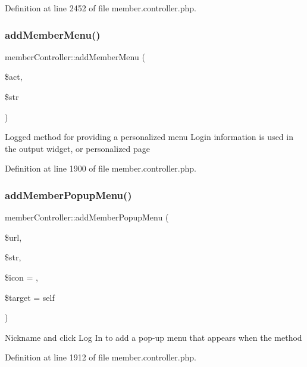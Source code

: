 Definition at line 2452 of file member.\+controller.\+php.

\mbox{\label{classmemberController_aaa52725f8ba9ba16cfe4b350a51d7420}} 
\subsubsection{\texorpdfstring{add\+Member\+Menu()}{addMemberMenu()}}
{\footnotesize\ttfamily member\+Controller\+::add\+Member\+Menu (\begin{DoxyParamCaption}\item[{}]{\$act,  }\item[{}]{\$str }\end{DoxyParamCaption})}

Logged method for providing a personalized menu Login information is used in the output widget, or personalized page 

Definition at line 1900 of file member.\+controller.\+php.

\mbox{\label{classmemberController_a9672e0e43f813d6e791ab62543fc78b0}} 
\subsubsection{\texorpdfstring{add\+Member\+Popup\+Menu()}{addMemberPopupMenu()}}
{\footnotesize\ttfamily member\+Controller\+::add\+Member\+Popup\+Menu (\begin{DoxyParamCaption}\item[{}]{\$url,  }\item[{}]{\$str,  }\item[{}]{\$icon = {\ttfamily \textquotesingle{}\textquotesingle{}},  }\item[{}]{\$target = {\ttfamily \textquotesingle{}self\textquotesingle{}} }\end{DoxyParamCaption})}

Nickname and click Log In to add a pop-\/up menu that appears when the method 

Definition at line 1912 of file member.\+controller.\+php.


